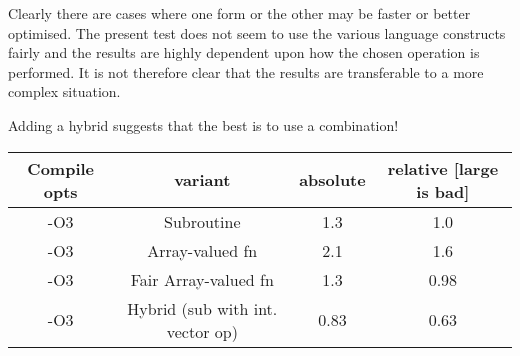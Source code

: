 \documentclass[a4paper,twoside,11pt]{article}
\begin{document}
Clearly there are cases where one form or the other may be faster or
better optimised.  The present test does not seem to use the various
language constructs fairly and the results are highly dependent upon 
how the chosen operation is performed.  It is not therefore clear that
the results are transferable to a more complex situation.

Adding a hybrid suggests that the best is to use a combination!

\begin{tabular}{cccc}
   Compile opts     &       variant       &     absolute & relative [large is bad] \\
\hline
   -O3     &  Subroutine            &    1.3    &   1.0 \\
   -O3     &  Array-valued fn       &    2.1    &   1.6 \\
   -O3     &  Fair Array-valued fn  &    1.3    &   0.98 \\
   -O3     &  Hybrid (sub with int. vector op) &    0.83    &   0.63 \\
\hline
\end{tabular}

\label{lastpage}
\end{document}
